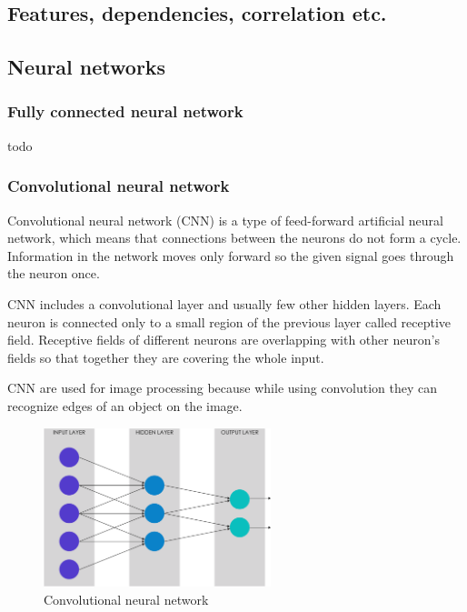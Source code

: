 \subsection{Features, dependencies, correlation etc.}
\subsection{Neural networks}
\subsubsection{Fully connected neural network}
todo
\subsubsection{Convolutional neural network}
Convolutional neural network (CNN) is a type of feed-forward artificial neural network, which means that connections between the neurons do not form a cycle. Information in the network moves only forward so the given signal goes through the neuron once.
\par CNN includes a convolutional layer and usually few other hidden layers. Each neuron is connected only to a small region of the previous layer called receptive field. Receptive fields of different neurons are overlapping with other neuron's fields so that together they are covering the whole input.
\par CNN are used for image processing because while using convolution they can recognize edges of an object on the image.
\begin{figure}[H]
\centering
\includegraphics[width=250px]{pictures/cnn.png}
\caption{Convolutional neural network}
\end{figure}

